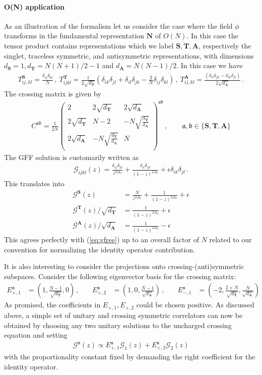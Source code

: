\documentclass[12pt]{article}
\numberwithin{equation}{section}
\newcommand{\reef}[1]{(\ref{#1})}
\newcommand{\bea}{\begin{eqnarray}}
\newcommand{\eea}{\end{eqnarray}}
\newcommand{\ba}{\begin{equation}\begin{aligned}}
\newcommand{\ea}{\end{aligned}\end{equation}}
\newcommand{\mbf}{\mathbf}
\newcommand{\Df}{{\Delta_\phi}}
\def\d{\delta}
\newcommand{\mf}[1]{\mathfrak #1}
\begin{document}
	\paragraph{O(N) application}
	As an illustration of the formalism let us consider the case where the field $\phi$ transforms in the fundamental representation $\mbf N$ of $O(N)$. In this case the tensor product contains representations which we label $\mbf S,\mbf T, \mbf A$, respectively the singlet, traceless symmetric, and antisymmetric representations, with dimensions $d_{\mbf S}=1, d_{\mbf T}= N(N+1)/2-1$ and $d_{\mbf A}=N(N-1)/2$. In this case we have
	\bea
	T^{\mbf S}_{ij,kl}=\frac {\d_{ij}\d_{kl}}{N}\,, \ T_{ijkl}^{\mbf T}=\frac 1{2\sqrt{d_{\mbf T}}} (\d_{ik}\d_{jl}+\d_{il}\d_{jk}-\frac{2}{N}\d_{ij}\d_{kl})\,,\ T_{ij,kl}^{\mbf A}=\frac { (\d_{il}\d_{jk}-\d_{ik}\d_{jl})}{2\sqrt{d_{\mbf A}}}\,.
	\eea
	The crossing matrix is given by
	\bea
	C^{\mf a \mf b}=\frac{1}{2N}
	\left(
	\begin{array}{ccc}
		2 & 2\sqrt{d_{\mbf T}} & 2\sqrt{d_{\mbf A}} \\
		2\sqrt{d_{\mbf T}} & N-2 & -N \sqrt{\frac{d_{\mbf T}}{d_{\mbf A}}} \\
		2\sqrt{d_{\mbf A}} &  -N \sqrt{\frac{d_{\mbf T}}{d_{\mbf A}}}  & N \\
	\end{array}
	\right)^{\mf a \mf b}\,, \qquad \mf a, \mf b \in \{\mbf S, \mbf T, \mbf A\}
	\eea
	The GFF solution is customarily written as
	\bea
	\mathcal G_{ijkl}(z)=\frac{\delta_{ij} \delta_{kl}}{z^{2\Df}}+\frac{\delta_{il} \delta_{jk}}{(1-z)^{2\Df}}+\epsilon \delta_{ik}\delta_{jl}\,.
	\eea
	This translates into
	\ba
	\mathcal G^{\mbf S}(z)&=\frac{N}{z^{2\Df}}+\frac{1}{(1-z)^{2\Df}}+\epsilon\\
	\mathcal G^{\mbf T}(z)/\sqrt{d_{\mbf T}}&=\frac{1}{(1-z)^{2\Df}}+\epsilon\\
	\mathcal G^{\mbf A}(z)/\sqrt{d_{\mbf A}}&=\frac{1}{(1-z)^{2\Df}}-\epsilon
	\ea
	This agrees perfectly with \reef{eq:gfree} up to an overall factor of $N$ related to our convention for normalizing the identity operator contribution.
	
	It is also interesting to consider the projections onto crossing-(anti)symmetric subspaces. Consider the following eigenvector basis for the crossing matrix:
	\ba
	E_{+,1}^{\mf a}&=\left(1,\frac{N-1}{\sqrt{d_{\mbf T}}},0\right)\,,& \quad  E_{+,2}^{\mf a}&=\left(1,0,\frac{N-1}{\sqrt{d_{\mbf A}}}\right)\,,& \quad E_{-,1}^{\mf a}&=\left(-2,\frac{2+N}{\sqrt{d_{\mbf T}}},\frac{N}{\sqrt{d_{\mbf A}}}\right)
	\ea
	As promised, the coefficients in $E_{+,1}, E_{+,2}$ could be chosen  positive. As discussed above, a simple set of unitary and crossing symmetric correlators can now be obtained by choosing any two unitary solutions to the uncharged crossing equation and setting
	\ba
	\mathcal G^{\mf a}(z)\propto E_{+,1}^{\mf a} \mathcal G_1(z)+E_{+,2}^{\mf a} \mathcal G_2(z)
	\ea
	with the proportionality constant fixed by demanding the right coefficient for the identity operator.
	
\end{document}
